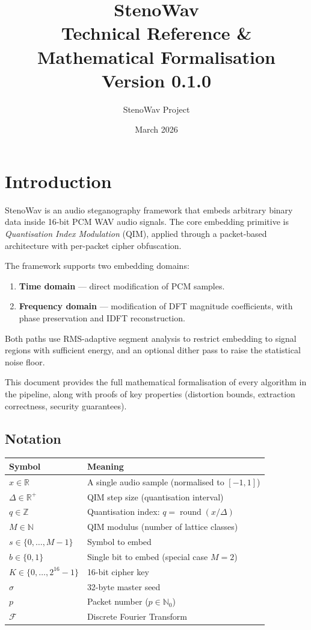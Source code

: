 \documentclass[11pt,a4paper]{article}
\title{
    \textbf{StenoWav} \\[0.5em]
    \Large Technical Reference \& Mathematical Formalisation \\[0.3em]
    \normalsize Version 0.1.0
}
\author{StenoWav Project}
\date{March 2026}
\newcommand{\R}{\mathbb{R}}
\newcommand{\Z}{\mathbb{Z}}
\newcommand{\N}{\mathbb{N}}
\newcommand{\F}{\mathcal{F}}
\DeclareMathOperator{\round}{round}
\begin{document}
\maketitle
\tableofcontents
\newpage

\section{Introduction}

StenoWav is an audio steganography framework that embeds arbitrary binary data
inside 16-bit PCM WAV audio signals.  The core embedding primitive is
\emph{Quantisation Index Modulation} (QIM), applied through a packet-based
architecture with per-packet cipher obfuscation.

The framework supports two embedding domains:
\begin{enumerate}
    \item \textbf{Time domain} --- direct modification of PCM samples.
    \item \textbf{Frequency domain} --- modification of DFT magnitude
          coefficients, with phase preservation and IDFT reconstruction.
\end{enumerate}

Both paths use RMS-adaptive segment analysis to restrict embedding to
signal regions with sufficient energy, and an optional dither pass to
raise the statistical noise floor.

This document provides the full mathematical formalisation of every
algorithm in the pipeline, along with proofs of key properties (distortion
bounds, extraction correctness, security guarantees).

\subsection{Notation}

\begin{center}
\begin{tabular}{@{}ll@{}}
\toprule
Symbol & Meaning \\
\midrule
$x \in \R$ & A single audio sample (normalised to $[-1, 1]$) \\
$\Delta \in \R^+$ & QIM step size (quantisation interval) \\
$q \in \Z$ & Quantisation index: $q = \round(x / \Delta)$ \\
$M \in \N$ & QIM modulus (number of lattice classes) \\
$s \in \{0, \ldots, M-1\}$ & Symbol to embed \\
$b \in \{0, 1\}$ & Single bit to embed (special case $M=2$) \\
$K \in \{0, \ldots, 2^{16}-1\}$ & 16-bit cipher key \\
$\sigma$ & 32-byte master seed \\
$p$ & Packet number ($p \in \N_0$) \\
$\F$ & Discrete Fourier Transform \\
\bottomrule
\end{tabular}
\end{center}
\end{document}
